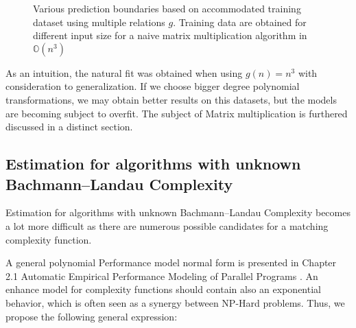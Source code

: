 \begin{figure}[H]
\caption{Various prediction boundaries based on accommodated training dataset using multiple relations $g$. Training data are obtained for different input size for a naive matrix multiplication algorithm in $\mathbb{O}(n^{3})$}
\end{figure}

As an intuition, the natural fit was obtained when using $g(n) = n^3$ with consideration to generalization. If we choose bigger degree polynomial transformations, we may obtain better results on this datasets, but the models are becoming subject to overfit. The subject of Matrix multiplication is furthered discussed in a distinct section. 


\subsection{Estimation for algorithms with unknown Bachmann–Landau Complexity}
Estimation for algorithms with unknown Bachmann–Landau Complexity becomes a lot more difficult as there are numerous possible candidates for a matching complexity function. 

A general polynomial Performance model normal form is presented in Chapter 2.1 Automatic Empirical Performance Modeling of Parallel Programs \cite{calotoiu2018automatic}. An enhance model for complexity functions should contain also an exponential behavior, which is often seen as a synergy between NP-Hard problems. Thus, we propose the following general expression:

